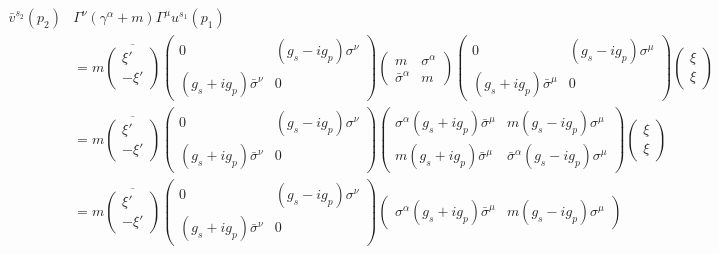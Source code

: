 \documentclass[12pt]{article}
\begin{document}
\begin{align*}
\bar{v}^{s_2}(p_2) & \Gamma^\nu (\gamma^\alpha + m) \Gamma^\mu u^{s_1}(p_1)
\\
& = m 
\overline{\begin{pmatrix}
\xi'
\\
-\xi'
\end{pmatrix}}
\begin{pmatrix}
0 & (g_s - i g_p) \sigma^\nu
\\
(g_s + i g_p) \bar{\sigma}^\nu & 0
\end{pmatrix}
\begin{pmatrix}
m & \sigma^\alpha
\\
\bar{\sigma}^\alpha & m
\end{pmatrix}
\begin{pmatrix}
0 & (g_s - i g_p) \sigma^\mu
\\
(g_s + i g_p) \bar{\sigma}^\mu & 0
\end{pmatrix}
\begin{pmatrix}
\xi
\\
\xi
\end{pmatrix}
\\
& = m 
\overline{\begin{pmatrix}
\xi'
\\
-\xi'
\end{pmatrix}}
\begin{pmatrix}
0 & (g_s - i g_p) \sigma^\nu
\\
(g_s + i g_p) \bar{\sigma}^\nu & 0
\end{pmatrix}
\begin{pmatrix}
\sigma^\alpha (g_s + i g_p) \bar{\sigma}^\mu & m (g_s - i g_p) \sigma^\mu 
\\
m (g_s + i g_p) \bar{\sigma}^\mu & \bar{\sigma}^\alpha (g_s - i g_p) \sigma^\mu 
\end{pmatrix}
\begin{pmatrix}
\xi
\\
\xi
\end{pmatrix}
\\
& = m 
\overline{\begin{pmatrix}
\xi'
\\
-\xi'
\end{pmatrix}}
\begin{pmatrix}
0 & (g_s - i g_p) \sigma^\nu
\\
(g_s + i g_p) \bar{\sigma}^\nu & 0
\end{pmatrix}
\begin{pmatrix}
\sigma^\alpha (g_s + i g_p) \bar{\sigma}^\mu & m (g_s - i g_p) \sigma^\mu 

\end{pmatrix}
\end{align*}
\end{document}

